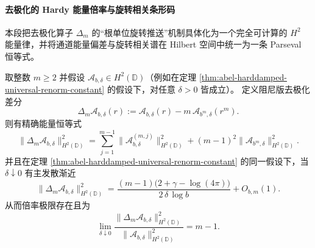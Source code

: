 \paragraph{去极化的 Hardy 能量倍率与旋转相关条形码}
本段把去极化算子 \(\Delta_m\) 的“根单位旋转推送”机制具体化为一个完全可计算的 \(H^2\) 能量律，并将通道能量偏差与旋转相关谱在 Hilbert 空间中统一为一条 Parseval 恒等式。

\begin{theorem}\label{thm:abel-depolarization-hardy-energy-blowup}
取整数 \(m\ge 2\) 并假设 \(\mathcal A_{b,\delta}\in H^2(\mathbb D)\)（例如在定理 \ref{thm:abel-harddamped-universal-renorm-constant} 的假设下，对任意 \(\delta>0\) 皆成立）。
定义阻尼版去极化差分
\[
\Delta_m\mathcal A_{b,\delta}(r):=\mathcal A_{b,\delta}(r)-m\,\mathcal A_{b^m,\delta}(r^m).
\]
则有精确能量恒等式
\begin{equation}\label{eq:abel-depolarization-energy-identity}
\boxed{\;
\|\Delta_m\mathcal A_{b,\delta}\|_{H^2(\mathbb D)}^2
=\sum_{j=1}^{m-1}\|\mathcal A_{b,\delta}^{(m,j)}\|_{H^2(\mathbb D)}^2
+(m-1)^2\|\mathcal A_{b^m,\delta}\|_{H^2(\mathbb D)}^2.\;}
\end{equation}
并且在定理 \ref{thm:abel-harddamped-universal-renorm-constant} 的同一假设下，当 \(\delta\downarrow 0\) 有主发散渐近
\[
\boxed{\;
\|\Delta_m\mathcal A_{b,\delta}\|_{H^2(\mathbb D)}^2
=\frac{(m-1)\bigl(2+\gamma-\log(4\pi)\bigr)}{2\,\delta\,\log b}+O_{b,m}(1).\;}
\]
从而倍率极限存在且为
\[
\boxed{\;
\lim_{\delta\downarrow 0}\frac{\|\Delta_m\mathcal A_{b,\delta}\|_{H^2(\mathbb D)}^2}{\|\mathcal A_{b,\delta}\|_{H^2(\mathbb D)}^2}=m-1.\;}
\]
\end{theorem}

